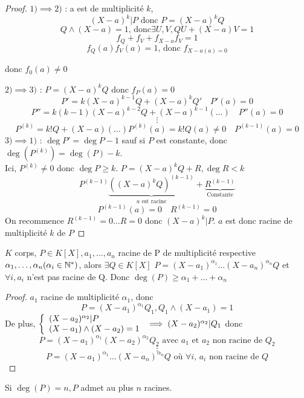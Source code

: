 \documentclass[]{report}
\begin{document}
    \begin{proof}
        $1)\implies 2)$ : a est de multiplicité $k$,
        \[(X-a)^k|P\text{ donc }P=(X-a)^k Q\]
        \[Q\wedge (X-a)=1\text{, donc}\exists U,V, QU+(X-a)V=1\]
        \[f_Q+f_V+f_{X-a}f_V=1\]
        \[f_Q(a)f_V(a)=1\text{, donc }f_{X-a(a)=0}\]
        \begin{center}
            donc $f_0(a)\neq0$
        \end{center}
        $2)\implies 3)$ : $P=(X-a)^kQ$ donc $f_P(a)=0$
        \[P'=k(X-a)^{k-1}Q+(X-a)^k Q'\quad P'(a)=0\]
        \[P''=k(k-1)(X-a)^{k-2}Q+(X-a)^{k-1}(\ldots)\quad P''(a)=0\]
        \[\vdots\]
        \[P^{(k)}=k!Q+(X-a)(\ldots)P^{(k)}(a)=k!Q(a)\neq0\quad P^{(k-1)}(a)=0\]
        $3)\implies 1)$ : $\deg P'=\deg P - 1$ sauf si $P$ est constante, donc $\deg(P^{(k)})=\deg(P)-k$.\\
        Ici, $P^{(k)}\neq 0$ donc $\deg P\ge k$. $P=(X-a)^k Q+R,\deg R<k$\\
        \[P^{(k-1)}\underset{a\text{ est racine}}{\underbrace{((X-a)^k Q)^{(k-1)}}}+\underset{\text{Constante}}{\underbrace{R^{(k-1)}}}\]
        \[P^{(k-1)}(a)=0\quad R^{(k-1)}=0\]
        On recommence $R^{(k-1)}=0\ldots R=0$ donc $(X-a)^k|P$. $a $ est donc racine de multiplicité $k $ de $P$
    \end{proof}

    \begin{tm}{}{}
        $K$ corps, $P\in K[X],a_1,\dots,a_n$ racine de P de multiplicité respective $\alpha_1,\dots,\alpha_n(\alpha_i\in\mathbb{N}^*)$, alors $\exists Q \in K[X]$ \tq $P=(X-a_1)^{\alpha_1}\dots(X-a_n)^{\alpha_n}Q$ et $\forall i,a_i$ n'est pas racine de Q. Donc $\deg(P)\ge\alpha_1+\dots+\alpha_n$
    \end{tm}

    \begin{proof}
        $a_1$ racine de multiplicité $\alpha_1$, donc
        \[P=(X-a_1)^{\alpha_1}Q_1,Q_1\wedge(X-a_1)=1\]
        De plus, $\left\{\begin{array}{ll} (X-a_2)^{\alpha_2}|P\\(X-a_1)\wedge(X-a_2)=1 \end{array} \right.\implies (X-a_2)^{\alpha_2}|Q_1$ donc
        \[P=(X-a_1)^{\alpha_1}(X-a_2)^{\alpha_2}Q_2\text{ avec $a_1$ et $a_2$ non racine de $Q_2$}\]
        \[\vdots\]
        \[P=(X-a_1)^{\alpha_1}\ldots(X-a_n)^{\alpha_n}Q\text{ où }\forall i\text{, $a_i$ non racine de $Q$}\]
    \end{proof}

    \begin{re}{}{}
        Si $\deg(P)=n, P$ admet au plus $n$ racines.
    \end{re}
\end{document}
